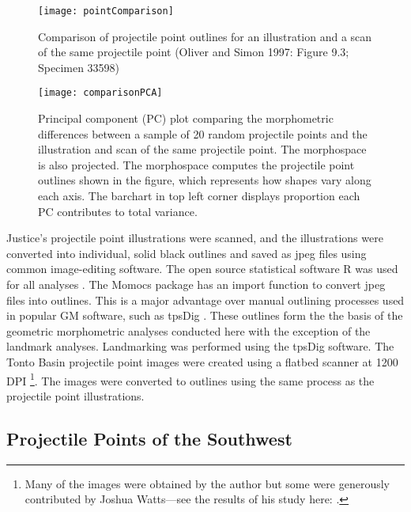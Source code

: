 \documentclass[PCJ,Unicode,screen,mode=plain]{cedram}
\begin{document}
\begin{figure}
\texttt{[image: pointComparison]} \caption{Comparison of projectile point outlines for an illustration and a scan of the same projectile point (Oliver and Simon 1997: Figure 9.3; Specimen 33598)}\label{fig:pointComparison}
\end{figure}

\begin{figure}
\texttt{[image: comparisonPCA]} \caption{Principal component (PC) plot comparing the morphometric differences between a sample of 20 random projectile points and the illustration and scan of the same projectile point. The morphospace is also projected. The morphospace computes the projectile point outlines shown in the figure, which represents how shapes vary along each axis. The barchart in top left corner displays proportion each PC contributes to total variance.}\label{fig:comparisonPCA}
\end{figure}

Justice's projectile point illustrations were scanned, and the illustrations were converted into individual, solid black outlines and saved as jpeg files using common image-editing software. The open source statistical software R was used for all analyses \autocite{R_Core_Team2022-wb}. The Momocs package \autocite{Bonhomme2014-gt} has an import function to convert jpeg files into outlines. This is a major advantage over manual outlining processes used in popular GM software, such as tpsDig \autocite{James_Rohlf2015-ui}. These outlines form the the basis of the geometric morphometric analyses conducted here with the exception of the landmark analyses. Landmarking was performed using the tpsDig software. The Tonto Basin projectile point images were created using a flatbed scanner at 1200 DPI \footnote{Many of the images were obtained by the author but some were generously contributed by Joshua Watts---see the results of his study here: \autocite{Watts2013-ub}.}. The images were converted to outlines using the same process as the projectile point illustrations.

\subsection{Projectile Points of the Southwest}
\end{document}
